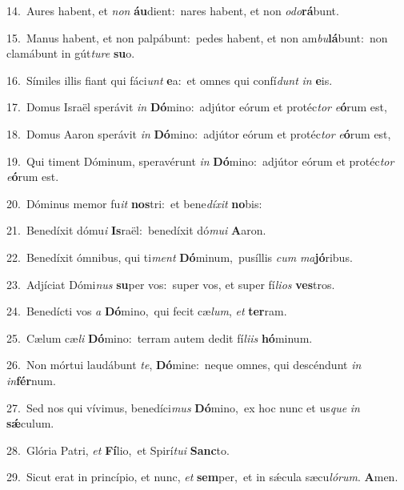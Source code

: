 {\numbfont\textcolor{\numbcolor}{14.}}~Aures habent, et \textit{non} \textbf{áu}\-dient:~\star nares habent, et non \textit{o}\-\textit{do}\textbf{rá}bunt.\par
{\numbfont\textcolor{\numbcolor}{15.}}~Manus habent, et non palpábunt:~\dagger pedes habent, et non am\-\textit{bu}\-\textbf{lá}bunt:~\star non clamábunt in gút\-\textit{tu}\-\textit{re} \textbf{su}\-o.\par
{\numbfont\textcolor{\numbcolor}{16.}}~Símiles illis fiant qui fáci\textit{unt} \textbf{e}\-a:~\star et omnes qui confí\textit{dunt} \textit{in} \textbf{e}\-is.\par
{\numbfont\textcolor{\numbcolor}{17.}}~Domus Israël sperávit \textit{in} \textbf{Dó}\-mino:~\star adjútor eórum et protéc\textit{tor} \textit{e}\-\textbf{ó}rum est,\par
{\numbfont\textcolor{\numbcolor}{18.}}~Domus Aaron sperávit \textit{in} \textbf{Dó}\-mino:~\star adjútor eórum et protéc\textit{tor} \textit{e}\-\textbf{ó}rum est,\par
{\numbfont\textcolor{\numbcolor}{19.}}~Qui timent Dóminum, speravérunt \textit{in} \textbf{Dó}\-mino:~\star adjútor eórum et protéc\textit{tor} \textit{e}\-\textbf{ó}rum est.\par
{\numbfont\textcolor{\numbcolor}{20.}}~Dóminus memor fu\textit{it} \textbf{nos}\-tri:~\star et bene\-\textit{dí}\-\textit{xit} \textbf{no}\-bis:\par
{\numbfont\textcolor{\numbcolor}{21.}}~Benedíxit dómu\textit{i} \textbf{Is}\-raël:~\star benedíxit dó\-\textit{mu}\-\textit{i} \textbf{A}\-aron.\par
{\numbfont\textcolor{\numbcolor}{22.}}~Benedíxit ómnibus, qui ti\textit{ment} \textbf{Dó}\-minum,~\star pusíllis \textit{cum} \textit{ma}\-\textbf{jó}ribus.\par
{\numbfont\textcolor{\numbcolor}{23.}}~Adjíciat Dómi\textit{nus} \textbf{su}\-per vos:~\star super vos, et super fí\-\textit{li}\-\textit{os} \textbf{ves}\-tros.\par
{\numbfont\textcolor{\numbcolor}{24.}}~Benedícti vos \textit{a} \textbf{Dó}\-mino,~\star qui fecit cæ\-\textit{lum}\-, \textit{et} \textbf{ter}\-ram.\par
{\numbfont\textcolor{\numbcolor}{25.}}~Cælum cæ\textit{li} \textbf{Dó}\-mino:~\star terram autem dedit fí\-\textit{li}\-\textit{is} \textbf{hó}\-minum.\par
{\numbfont\textcolor{\numbcolor}{26.}}~Non mórtui laudábunt \textit{te}\-, \textbf{Dó}\-mine:~\star neque omnes, qui descéndunt \textit{in} \textit{in}\-\textbf{fér}num.\par
{\numbfont\textcolor{\numbcolor}{27.}}~Sed nos qui vívimus, benedíci\textit{mus} \textbf{Dó}\-mino,~\star ex hoc nunc et us\textit{que} \textit{in} \textbf{sǽ}\-culum.\par
{\numbfont\textcolor{\numbcolor}{28.}}~Glória Patri, \textit{et} \textbf{Fí}\-lio,~\star et Spirí\-\textit{tu}\-\textit{i} \textbf{Sanc}\-to.\par
{\numbfont\textcolor{\numbcolor}{29.}}~Sicut erat in princípio, et nunc, \textit{et} \textbf{sem}\-per,~\star et in sǽcula sæcu\-\textit{ló}\-\textit{rum}. \textbf{A}\-men.\par
